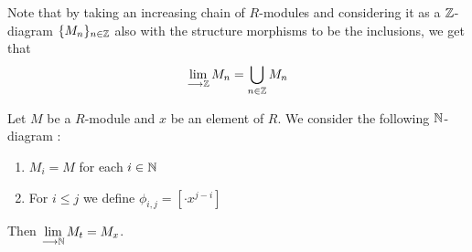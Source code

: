 \documentclass[11pt, a4paper, twoside]{article}
\begin{document}
\begin{remark}\label{remark:union_limit}
Note that by taking an increasing chain of $R$-modules and considering it as a $\mathbb{Z}$-diagram $\{M_n\}_{n\in\mathbb{Z}}$ also with the structure morphisms to be the inclusions, we get that $$\lim\limits_{\longrightarrow \mathbb{Z}}M_n=\bigcup_{n\in\mathbb{Z}}M_n$$  
\end{remark}
\begin{prop}
Let $M$ be a $R$-module and $x$ be an element of $R$. We consider the following $\mathbb{N}$-diagram :
\begin{enumerate}
    \item $M_i=M$ for each $i\in\mathbb{N}$
    \item For $i\leq j$ we define $\phi_{i,j}=[\cdot x^{j-i}]$
\end{enumerate}
Then $\lim\limits_{\longrightarrow \mathbb{N}}M_t=M_x$.
\end{prop}
\end{document}
